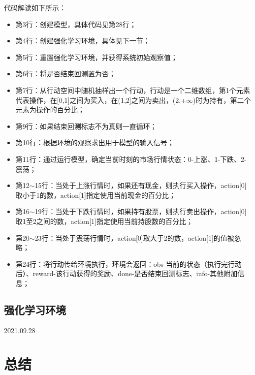 代码解读如下所示：
\begin{itemize}
    \item 第3行：创建模型，具体代码见第28行；
    \item 第4行：创建强化学习环境，具体见下一节；
    \item 第5行：重置强化学习环境，并获得系统初始观察值；
    \item 第6行：将是否结束回测置为否；
    \item 第7行：从行动空间中随机抽样出一个行动，行动是一个二维数组，第1个元素代表操作，在[0,1]之间为买入，在(1,2]之间为卖出，(2,+$\infty$)时为持有，第二个
    元素为操作的百分比；
    \item 第9行：如果结束回测标志不为真则一直循环；
    \item 第10行：根据环境的观察求出用于模型的输入信号；
    \item 第11行：通过运行模型，确定当前时刻的市场行情状态：0-上涨、1-下跌、2-震荡；
    \item 第12$\sim$15行：当处于上涨行情时，如果还有现金，则执行买入操作，action[0]取小于1的数，action[1]指定使用当前现金的百分比；
    \item 第16$\sim$19行：当处于下跌行情时，如果持有股票，则执行卖出操作，action[0]取1至2之间的数，action[1]指定使用当前持股数的百分比；
    \item 第20$\sim$23行：当处于震荡行情时，action[0]取大于2的数，action[1]的值被忽略；
    \item 第24行：将行动传给环境执行，环境会返回：obs-当前的状态（执行完行动后）、reward-该行动获得的奖励、done-是否结束回测标志、info-其他附加信息；
\end{itemize}

\subsection{强化学习环境}
2021.09.28

\section{总结}